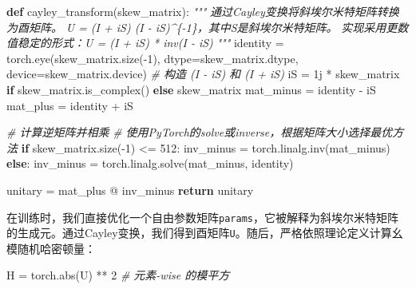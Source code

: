 \documentclass[
  12pt,
]{article}
\newenvironment{Shaded}{}{}
\newcommand{\BuiltInTok}[1]{#1}
\newcommand{\CommentTok}[1]{\textcolor[rgb]{0.38,0.63,0.69}{\textit{#1}}}
\newcommand{\ControlFlowTok}[1]{\textcolor[rgb]{0.00,0.44,0.13}{\textbf{#1}}}
\newcommand{\DecValTok}[1]{\textcolor[rgb]{0.25,0.63,0.44}{#1}}
\newcommand{\KeywordTok}[1]{\textcolor[rgb]{0.00,0.44,0.13}{\textbf{#1}}}
\newcommand{\NormalTok}[1]{#1}
\newcommand{\OperatorTok}[1]{\textcolor[rgb]{0.40,0.40,0.40}{#1}}
\newcommand{\OtherTok}[1]{\textcolor[rgb]{0.00,0.44,0.13}{#1}}
\begin{document}
\begin{Shaded}
\begin{Highlighting}[]
\KeywordTok{def}\NormalTok{ cayley\_transform(skew\_matrix):}
    \CommentTok{"""}
\CommentTok{    通过Cayley变换将斜埃尔米特矩阵转换为酉矩阵。}
\CommentTok{    U = (I + iS) (I {-} iS)\^{}\{{-}1\}，其中S是斜埃尔米特矩阵。}
\CommentTok{    实现采用更数值稳定的形式：U = (I + iS) * inv(I {-} iS)}
\CommentTok{    """}
\NormalTok{    identity }\OperatorTok{=}\NormalTok{ torch.eye(skew\_matrix.size(}\OperatorTok{{-}}\DecValTok{1}\NormalTok{), }
\NormalTok{                         dtype}\OperatorTok{=}\NormalTok{skew\_matrix.dtype, }
\NormalTok{                         device}\OperatorTok{=}\NormalTok{skew\_matrix.device)}
    \CommentTok{\# 构造 (I {-} iS) 和 (I + iS)}
\NormalTok{    iS }\OperatorTok{=} \OtherTok{1j} \OperatorTok{*}\NormalTok{ skew\_matrix }\ControlFlowTok{if}\NormalTok{ skew\_matrix.is\_complex() }\ControlFlowTok{else}\NormalTok{ skew\_matrix}
\NormalTok{    mat\_minus }\OperatorTok{=}\NormalTok{ identity }\OperatorTok{{-}}\NormalTok{ iS}
\NormalTok{    mat\_plus }\OperatorTok{=}\NormalTok{ identity }\OperatorTok{+}\NormalTok{ iS}
    
    \CommentTok{\# 计算逆矩阵并相乘}
    \CommentTok{\# 使用PyTorch的solve或inverse，根据矩阵大小选择最优方法}
    \ControlFlowTok{if}\NormalTok{ skew\_matrix.size(}\OperatorTok{{-}}\DecValTok{1}\NormalTok{) }\OperatorTok{\textless{}=} \DecValTok{512}\NormalTok{:}
\NormalTok{        inv\_minus }\OperatorTok{=}\NormalTok{ torch.linalg.inv(mat\_minus)}
    \ControlFlowTok{else}\NormalTok{:}
\NormalTok{        inv\_minus }\OperatorTok{=}\NormalTok{ torch.linalg.solve(mat\_minus, identity)}
    
\NormalTok{    unitary }\OperatorTok{=}\NormalTok{ mat\_plus }\OperatorTok{@}\NormalTok{ inv\_minus}
    \ControlFlowTok{return}\NormalTok{ unitary}
\end{Highlighting}
\end{Shaded}

在训练时，我们直接优化一个自由参数矩阵\texttt{params}，它被解释为斜埃尔米特矩阵的生成元。通过Cayley变换，我们得到酉矩阵\texttt{U}。随后，严格依照理论定义计算幺模随机哈密顿量：

\begin{Shaded}
\begin{Highlighting}[]
\NormalTok{H }\OperatorTok{=}\NormalTok{ torch.}\BuiltInTok{abs}\NormalTok{(U) }\OperatorTok{**} \DecValTok{2}  \CommentTok{\# 元素{-}wise 的模平方}
\end{Highlighting}
\end{Shaded}
\end{document}
